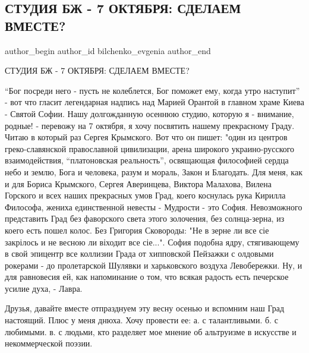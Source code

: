  
 
 
 
 
 
\subsection{СТУДИЯ БЖ - 7 ОКТЯБРЯ: СДЕЛАЕМ ВМЕСТЕ?}
\label{sec:19_09_2018.fb.bilchenko_evgenia.1.kiev_oranta_sofia}
\ifcmt
 author_begin
   author_id bilchenko_evgenia
 author_end
\fi

СТУДИЯ БЖ - 7 ОКТЯБРЯ: СДЕЛАЕМ ВМЕСТЕ?

\enquote{Бог посреди него - пусть не колеблется, Бог поможет ему, когда утро наступит}
- вот что гласит легендарная надпись над Марией Орантой в главном храме Киева -
Святой Софии. Нашу долгожданную осеннюю студию, которую я - внимание, родные! -
перевожу на 7 октября, я хочу посвятить нашему прекрасному Граду. Читаю в
который раз Сергея Крымского. Вот что он пишет: "один из центров
греко-славянской православной цивилизации, арена широкого украино-русского
взаимодействия, \enquote{платоновская реальность}, освящающая философией сердца небо и
землю, Бога и человека, разум и мораль, Закон и Благодать. Для меня, как и для
Бориса Крымского, Сергея Аверинцева, Виктора Малахова, Вилена Горского и всех
наших прекрасных умов Град, коего коснулась рука Кирилла Философа, жениха
единственной невесты - Мудрости - это София. Невозможного представить Град без
фаворского света этого золочения, без солнца-зерна, из коего есть пошел колос.
Без Григория Сковороды:  "Не в зерне ли все сіе закрілось и не весною ли
віходит все сіе...". София подобна ядру, стягивающему в свой эпицентр все
коллизии Града от хипповской Пейзажки с олдовыми рокерами - до пролетарской
Шулявки и харьковского воздуха Левобережки. Ну, и для равновесия ей, как
напоминание о том, что всякая радость есть печерское усилие духа, - Лавра.  

Друзья, давайте вместе отпразднуем эту весну осенью и вспомним наш Град
настоящий. Плюс у меня днюха. Хочу провести ее: а. с талантливыми. б. с
любимыми. в. с людьми, кто разделяет мое мнение об альтруизме в искусстве и
некоммерческой поэзии.  

